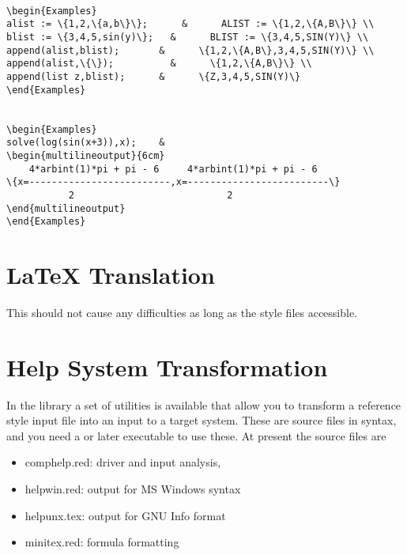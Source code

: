 \begin{verbatim}

\begin{Examples}
alist := \{1,2,\{a,b\}\};      &      ALIST := \{1,2,\{A,B\}\} \\
blist := \{3,4,5,sin(y)\};   &      BLIST := \{3,4,5,SIN(Y)\} \\
append(alist,blist);       &      \{1,2,\{A,B\},3,4,5,SIN(Y)\} \\
append(alist,\{\});          &      \{1,2,\{A,B\}\} \\
append(list z,blist);      &      \{Z,3,4,5,SIN(Y)\}
\end{Examples}


\begin{Examples}
solve(log(sin(x+3)),x);    &
\begin{multilineoutput}{6cm}
    4*arbint(1)*pi + pi - 6     4*arbint(1)*pi + pi - 6
\{x=-------------------------,x=-------------------------\}
	       2                           2
\end{multilineoutput}
\end{Examples}
\end{verbatim}

\section{\LaTeX{} Translation}

This should not cause any difficulties as long as the style files accessible.

\section{Help System Transformation}

In the \REDUCE library a set of utilities is available that allow you to
transform a reference style input file into an input to a target system.
These are source files in \REDUCE syntax, and you need a  or later
executable to use these. At present the source files are

\begin{itemize}
\item  comphelp.red: driver and input analysis,

\item  helpwin.red: output for MS Windows syntax

\item  helpunx.tex: output for GNU Info format

\item  minitex.red: formula formatting
\end{itemize}

